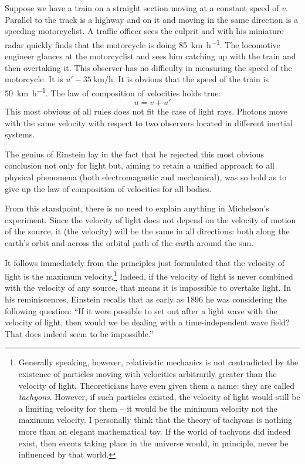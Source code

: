 Suppose we have a train on a straight section moving at a constant speed of $v$. Parallel to the track is a highway and on it and moving in the same direction is a speeding motorcyclist. A traffic officer sees the culprit and with his miniature radar quickly finds that the motorcycle is doing \SI{85}{\kilo\meter\per\hour}. The locomotive engineer glances at the motorcyclist and sees him catching up with the train and then overtaking it. This observer has no difficulty in measuring the speed of the motorcycle. It is $u' - \SI{35}{\kilo\meter\per\hour}$. It is obvious that the speed of the train is \SI{50}{\kilo\meter\per\hour}. The law of composition of velocities holds true:
\begin{equation*}%
u = v + u'
\end{equation*}
This most obvious of all rules does not fit the case of light rays. Photons move with the same velocity with respect to two observers located in different inertial sys­tems.

The genius of Einstein lay in the fact that he rejected this most obvious conclusion not only for light but, aiming to retain a unified approach to all physical phe­nomena (both electromagnetic and mechanical), was so bold as to give up the law of composition of velocities for all bodies.

From this standpoint, there is no need to explain anything in Michelson's experiment. Since the velocity of light does not depend on the velocity of motion of the source, it (the velocity) will be the same in all directions: both along the earth's orbit and across the orbital path of the earth around the sun.

It follows immediately from the principles just for­mulated that the velocity of light is the maximum veloc­ity.\footnote{Generally speaking, however, relativistic mechanics is not con­tradicted by the existence of particles moving with velocities arbitrarily greater than the velocity of light. Theoreticians have even given them a name: they are called \emph{tachyons}. However, if such particles existed, the velocity of light would still be a limiting velocity for them -- it would be the minimum veloc­ity not the maximum velocity. I personally think that the theory of tachyons is nothing more than an elegant mathematical toy. If the world of tachyons did indeed exist, then events taking place in the universe would, in principle, never be influenced by that world.} Indeed, if the velocity of light is never combined with the velocity of any source, that means it is impossi­ble to overtake light. In his reminiscences, Einstein recalls that as early as 1896 he was considering the following question: ``If it were possible to set out after a light wave with the velocity of light, then would we be dealing with a time-independent wave field? That does indeed seem to be impossible.''

